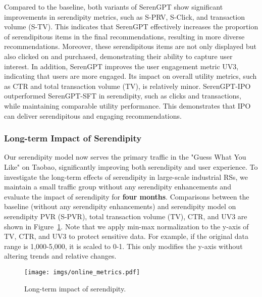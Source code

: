 Compared to the baseline, both variants of SerenGPT show significant improvements in serendipity metrics, such as S-PRV, S-Click, and transaction volume (S-TV). This indicates that SerenGPT effectively increases the proportion of serendipitous items in the final recommendations, resulting in more diverse recommendations. Moreover, these serendipitous items are not only displayed but also clicked on and purchased, demonstrating their ability to capture user interest. In addition, SerenGPT improves the user engagement metric UV3, indicating that users are more engaged. Its impact on overall utility metrics, such as CTR and total transaction volume (TV), is relatively minor. SerenGPT-IPO outperformed SerenGPT-SFT in serendipity, such as clicks and transactions, while maintaining comparable utility performance. This demonstrates that IPO can deliver serendipitous and engaging recommendations.
\subsubsection{Long-term Impact of Serendipity}
Our serendipity model now serves the primary traffic in the "Guess What You Like" on Taobao, significantly improving both serendipity and user experience. To investigate the long-term effects of serendipity in large-scale industrial RSs, we maintain a small traffic group without any serendipity enhancements and evaluate the impact of serendipity for \textbf{four months}. Comparisons between the baseline (without any serendipity enhancements) and serendipity model on serendipity PVR (S-PVR), total transaction volume (TV), CTR, and UV3 are shown in Figure~\ref{fig:long_ab}. Note that we apply min-max normalization to the y-axis of TV, CTR, and UV3 to protect sensitive data. For example, if the original data range is 1,000-5,000, it is scaled to 0-1. This only modifies the y-axis without altering trends and relative changes.
\begin{figure}
    \centering
    \texttt{[image: imgs/online\_metrics.pdf]}
    \vspace{-20pt}
    \caption{Long-term impact of serendipity.}
    \vspace{-10pt}
    \label{fig:long_ab}
\end{figure}


